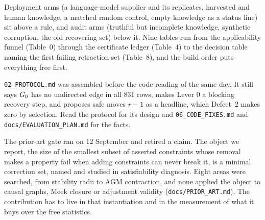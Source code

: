 Deployment arms (a language-model supplier and its replicates, harvested and human knowledge, a matched random control, empty
knowledge as a status line) sit above a rule, and audit arms (truthful but incomplete knowledge, synthetic corruption, the old
recovering set) below it. Nine tables run from the applicability funnel (Table~0) through the certificate ledger (Table~4) to the
decision table naming the first-failing retraction set (Table~8), and the build order puts everything free first.

\begin{center}
\end{center}

\begin{armadilha}
\texttt{02\_PROTOCOL.md} was assembled before the code reading of the same day. It still says $G_0$ has no undirected edge in all 831
rows, makes Lever 0 a blocking recovery step, and proposes safe moves $r - 1$ as a headline, which Defect~2 makes zero by selection.
Read the protocol for its design and \texttt{06\_CODE\_FIXES.md} and \texttt{docs/EVALUATION\_PLAN.md} for the facts.
\end{armadilha}

The prior-art gate ran on 12 September and retired a claim. The object we report, the size of the smallest subset of asserted
constraints whose removal makes a property fail when adding constraints can never break it, is a minimal correction set, named and
studied in satisfiability diagnosis. Eight areas were searched, from stability radii to AGM contraction, and none applied the object to
causal graphs, Meek closure or adjustment validity (\texttt{docs/PRIOR\_ART.md}). The contribution has to live in that instantiation
and in the measurement of what it buys over the free statistics.


